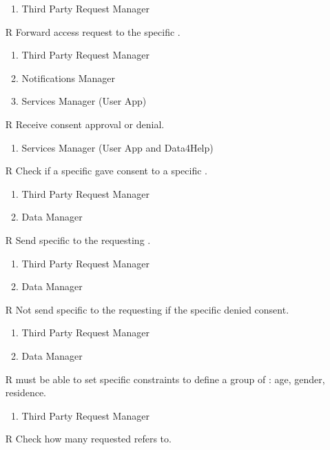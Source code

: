 \begin{itemize}
\begin{enumerate}
		\item Third Party Request Manager
	\end{enumerate}
	\item[R\subs{16}]Forward  access request to the specific .
	\begin{enumerate}
		\item Third Party Request Manager
		\item Notifications Manager
		\item Services Manager (User App)
	\end{enumerate}
	\item[R\subs{17}]Receive  consent approval or denial.
	\begin{enumerate}
		\item Services Manager (User App and Data4Help)
	\end{enumerate}
	\item[R\subs{18}]Check if a specific  gave consent to a specific .
	\begin{enumerate}
		\item Third Party Request Manager
		\item Data Manager
	\end{enumerate}
	\item[R\subs{19}]Send specific to the requesting .
	\begin{enumerate}
		\item Third Party Request Manager
		\item Data Manager
	\end{enumerate}
	\item[R\subs{20}]Not send specific to the requesting  if the specific  denied consent.
	\begin{enumerate}
		\item Third Party Request Manager
		\item Data Manager
	\end{enumerate}
	\item[R\subs{21}] must be able to set specific constraints to define a group of : age, gender, residence.
	\begin{enumerate}
		\item Third Party Request Manager
	\end{enumerate}
	\item[R\subs{22}]Check how many  requested  refers to.
	\begin{enumerate}

\end{enumerate}
\end{itemize}
